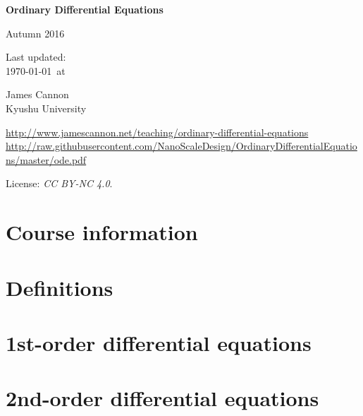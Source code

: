 \documentclass[a4paper]{book} %
\newcommand{\courseurl}{ordinary-differential-equations}
\begin{document}
\begin{titlepage}
    \begin{center}
        \vspace*{1cm}

        \Huge
        \textbf{Ordinary Differential Equations}

        Autumn 2016

        \vspace{1.5cm}
        \Large
        Last updated:\\\today \ at \currenttime

        \vspace{4.0cm}
        \LARGE
        James Cannon\\Kyushu University
        \vfill

        \normalsize
        \url{http://www.jamescannon.net/teaching/\courseurl}\\
        \vspace{0.3cm}
        \small
        \url{http://raw.githubusercontent.com/NanoScaleDesign/OrdinaryDifferentialEquations/master/ode.pdf}
        \vspace{0.5cm}

        License: \emph{CC BY-NC 4.0}.

    \end{center}
\end{titlepage}

\setcounter{chapter}{-1}

\tableofcontents

\chapter{Course information}
\newpage




\chapter{Definitions}

\chapter{1st-order differential equations}

\chapter{2nd-order differential equations}

\end{document}
